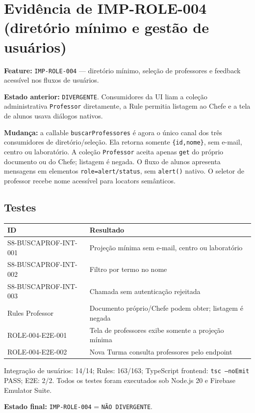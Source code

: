 \section{Evidência de IMP-ROLE-004 (diretório mínimo e gestão de usuários)}

\textbf{Feature:} \texttt{IMP-ROLE-004} --- diretório mínimo, seleção de
professores e feedback acessível nos fluxos de usuários.

\textbf{Estado anterior:} \texttt{DIVERGENTE}. Consumidores da UI liam a
coleção administrativa \texttt{Professor} diretamente, a Rule permitia
listagem ao Chefe e a tela de alunos usava diálogos nativos.

\textbf{Mudança:} a callable \texttt{buscarProfessores} é agora o único canal
dos três consumidores de diretório/seleção. Ela retorna somente
\texttt{\{id,nome\}}, sem e-mail, centro ou laboratório. A coleção
\texttt{Professor} aceita apenas \texttt{get} do próprio documento ou do Chefe;
listagem é negada. O fluxo de alunos apresenta mensagens em elementos
\texttt{role=alert/status}, sem \texttt{alert()} nativo. O seletor de professor
recebe nome acessível para locators semânticos.

\subsection{Testes}

\begin{longtable}{@{}p{}p{}@{}}
\toprule
ID & Resultado \\
\midrule
\endhead
S8-BUSCAPROF-INT-001 & Projeção mínima sem e-mail, centro ou laboratório \\
S8-BUSCAPROF-INT-002 & Filtro por termo no nome \\
S8-BUSCAPROF-INT-003 & Chamada sem autenticação rejeitada \\
Rules Professor & Documento próprio/Chefe podem obter; listagem é negada \\
ROLE-004-E2E-001 & Tela de professores exibe somente a projeção mínima \\
ROLE-004-E2E-002 & Nova Turma consulta professores pelo endpoint \\
\bottomrule
\end{longtable}

Integração de usuários: 14/14; Rules: 163/163; TypeScript frontend:
\texttt{tsc --noEmit} PASS; E2E: 2/2. Todos os testes foram executados sob
Node.js 20 e Firebase Emulator Suite.

\textbf{Estado final:} \texttt{IMP-ROLE-004} = \texttt{NÃO DIVERGENTE}.
